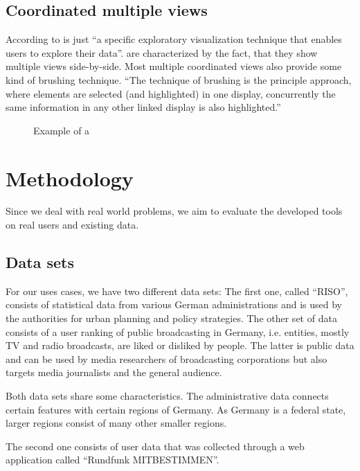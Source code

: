 \documentclass{article}
\begin{document}
\subsection{Coordinated multiple views}
According to \textcite{cmv:state_of_the_art} \cmvs{} is just ``a specific exploratory visualization technique that enables users to explore their data''.
\cmvs{} are characterized by the fact, that they show multiple views side-by-side.
Most multiple coordinated views also provide some kind of brushing technique.
``The technique of brushing is the principle approach, where elements are selected (and highlighted) in one display, concurrently the same information in any other linked display is also highlighted.''\cite{cmv:state_of_the_art}

\begin{figure}[h]
\centering
\caption{Example of a \cmvs{}}
\label{fig:research:cmv}
\end{figure}

\section{Methodology}

Since we deal with real world problems, we aim to evaluate the developed tools on real users and existing data.

\subsection{Data sets}
For our uses cases, we have two different data sets:
The first one, called ``RISO'', consists of statistical data from various German administrations and is used by the authorities for urban planning and policy strategies.
The other set of data consists of a user ranking of public broadcasting in Germany, i.e. entities, mostly TV and radio broadcasts, are liked or disliked by people.
The latter is public data and can be used by media researchers of broadcasting corporations but also targets media journalists and the general audience.

Both data sets share some characteristics.
The administrative data connects certain features with certain regions of Germany.
As Germany is a federal state, larger regions consist of many other smaller regions.

The second one consists of user data that was collected through a web application called ``Rundfunk MITBESTIMMEN''.
\end{document}

